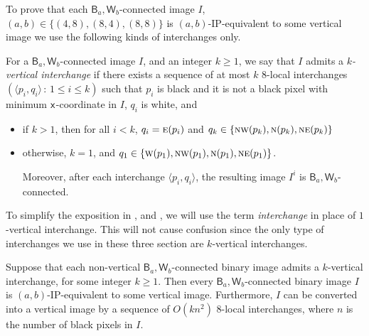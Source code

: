 \documentclass[lotsofwhite,charterfonts]{patmorin}
\newcommand{\N}{\textsc{n}}
\newcommand{\NE}{\textsc{ne}}
\newcommand{\E}{\textsc{e}}
\newcommand{\W}{\textsc{w}}
\newcommand{\NW}{\textsc{nw}}
\newcommand{\x}{\ensuremath{\protect\textup{\textsf{x}}}}
\newcommand{\ic}[2]{\langle #1,#2 \rangle}
\begin{document}
To prove that each $\textsf{B}_a,\textsf{W}_b$-connected image $I$,
$(a,b)\in \{(4,8), (8,4), (8,8)\}$ is $(a,b)$-IP-equivalent to some
vertical image we use the following kinds of interchanges only.

For a $\textsf{B}_a,\textsf{W}_b$-connected image $I$, and an integer
$k\geq 1$, we say that $I$ admits a \emph{$k$-vertical interchange} if
there exists a sequence of at most $k$ $8$-local interchanges
$(\ic{p_i}{q_i}\, :\, 1\leq i\leq k)$ such that $p_i$ is black and it
is not a black pixel  with minimum \x-coordinate in $I$, $q_i$ is
white, and 

\begin{itemize} 

\item if $k>1$, then for all $i<k$, $q_i=\E(p_i)$ and
$q_k\in\{\NW(p_k),\N(p_k),\NE(p_k)\}$ 

\item otherwise, $k=1$, and
$q_1\in\{\W(p_1),\NW(p_1),\N(p_1),\NE(p_1)\}$.

Moreover, after each interchange $\ic{p_i}{q_i}$, the resulting
image $I^i$ is $\textsf{B}_a,\textsf{W}_b$-connected. 
\end{itemize}

To simplify the exposition in , 
and , we will use the term \emph{interchange} in
place of $1$-vertical interchange. This will not cause confusion since
the only type of interchanges we use in these three section are
$k$-vertical interchanges.

\begin{lem} 
Suppose that each non-vertical $\textsf{B}_a,\textsf{W}_b$-connected
binary image admits a $k$-vertical interchange, for some integer
$k\geq 1$. Then every $\textsf{B}_a,\textsf{W}_b$-connected binary
image $I$ is $(a,b)$-IP-equivalent to some vertical image.
Furthermore, $I$ can be converted into a vertical image by a sequence
of $O(kn^2)$ 8-local interchanges, where $n$ is the number of black
pixels in $I$.
\end{lem}
\end{document}
